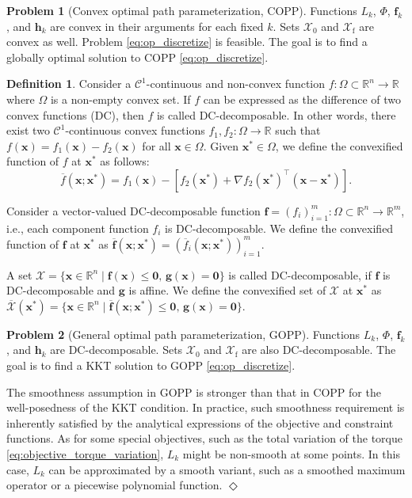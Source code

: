 \documentclass[journal]{IEEEtran}
\theoremstyle{definition}
\theoremstyle{definition}
\newtheorem{definition}{Definition}
\newtheorem{problem}{Problem}
\newtheorem*{remark}{Remark}
\let\oldremark\remark
\let\endoldremark\endremark
\renewenvironment{remark}
  {\oldremark}
  {\hfill$\Diamond$\endoldremark}
\newcommand\R{{\mathbb{R}}}
\renewcommand\vector[1]{\boldsymbol{#1}}
\newcommand\vf{{\vector{f}}}
\newcommand\vg{{\vector{g}}}
\newcommand\vh{{\vector{h}}}
\newcommand\vx{{\vector{x}}}
\newcommand\vzero{{\vector{0}}}
\begin{document}
\begin{problem}[Convex optimal path parameterization, COPP]\label{problem:convex}
    Functions $L_k$, $\Phi$, $\vf_k$, and $\vh_k$ are convex in their arguments for each fixed $k$. Sets $\mathcal{X}_0$ and $\mathcal{X}_\text{f}$ are convex as well. Problem \eqref{eq:op_discretize} is feasible. The goal is to find a globally optimal solution to COPP \eqref{eq:op_discretize}.
\end{problem}

\begin{definition}\label{def:DC_decomposable}
    \cite{sriperumbudur2009convergence}
    Consider a $\mathcal{C}^1$-continuous and non-convex function $f:\Omega\subset\R^n\to\R$ where $\Omega$ is a non-empty convex set. If $f$ can be expressed as the difference of two convex functions (DC), then $f$ is called DC-decomposable. In other words, there exist two $\mathcal{C}^1$-continuous convex functions $f_1,f_2:\Omega\to\R$ such that $f(\vx)=f_1(\vx)-f_2(\vx)$ for all $\vx\in\Omega$. Given $\vx^*\in\Omega$, we define the convexified function of $f$ at $\vx^*$ as follows:
    \begin{equation}
        \overline{f}(\vx;\vx^*)=f_1(\vx)-\left[f_2(\vx^*)+\nabla f_2(\vx^*)^\top(\vx-\vx^*)\right].
    \end{equation}

    Consider a vector-valued DC-decomposable function $\vf=(f_i)_{i=1}^m:\Omega\subset\R^n\to\R^m$, i.e., each component function $f_i$ is DC-decomposable. We define the convexified function of $\vf$ at $\vx^*$ as $\overline{\vf}(\vx;\vx^*)=(\overline{f}_i(\vx;\vx^*))_{i=1}^m$.

    A set $\mathcal{X}=\{\vx\in\R^n\mid \vf(\vx)\leq\vzero,\,\vg(\vx)=\vzero\}$ is called DC-decomposable, if $\vf$ is DC-decomposable and $\vg$ is affine. We define the convexified set of $\mathcal{X}$ at $\vx^*$ as $\overline{\mathcal{X}}(\vx^*)=\{\vx\in\R^n\mid \overline{\vf}(\vx;\vx^*)\leq\vzero,\,\vg(\vx)=\vzero\}$.
\end{definition}

\begin{problem}[General optimal path parameterization, GOPP]\label{problem:general}
    Functions $L_k$, $\Phi$, $\vf_k$, and $\vh_k$ are DC-decomposable. Sets $\mathcal{X}_0$ and $\mathcal{X}_\text{f}$ are also DC-decomposable. The goal is to find a KKT solution to GOPP \eqref{eq:op_discretize}.
\end{problem}

\begin{remark}
    The smoothness assumption in GOPP is stronger than that in COPP for the well-posedness of the KKT condition. In practice, such smoothness requirement is inherently satisfied by the analytical expressions of the objective and constraint functions. As for some special objectives, such as the total variation of the torque \eqref{eq:objective_torque_variation}, $L_k$ might be non-smooth at some points. In this case, $L_k$ can be approximated by a smooth variant, such as a smoothed maximum operator \cite{nesterov2005smooth} or a piecewise polynomial function.
\end{remark}
\end{document}
